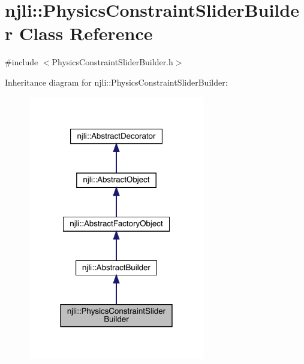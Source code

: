 \hypertarget{classnjli_1_1_physics_constraint_slider_builder}{}\section{njli\+:\+:Physics\+Constraint\+Slider\+Builder Class Reference}
\label{classnjli_1_1_physics_constraint_slider_builder}


{\ttfamily \#include $<$Physics\+Constraint\+Slider\+Builder.\+h$>$}



Inheritance diagram for njli\+:\+:Physics\+Constraint\+Slider\+Builder\+:\nopagebreak
\begin{figure}[H]
\begin{center}
\leavevmode
\includegraphics[width=219pt]{classnjli_1_1_physics_constraint_slider_builder__inherit__graph}
\end{center}
\end{figure}


